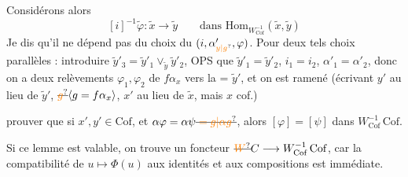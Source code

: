 Considérons alors
\[
 [i]^{-1}\widetilde\varphi\colon\widetilde x\longrightarrow\widetilde y
 \qquad\text{dans }\mathrm{Hom}_{W_{\mathrm{Cof}}^{-1}}(\widetilde x,\widetilde y)
\]
Je dis qu'il ne dépend pas du choix du $(i,\alpha'_{\unsure{y|g}},\varphi)$. Pour deux tels choix 
parallèles : introduire $\widetilde y'_3=\widetilde y'_1\vee_{\widetilde y}\widetilde y'_2$, OPS que $\widetilde y'_1=\widetilde y'_2$, $i_1=i_2$, $\alpha'_1=\alpha'_2$, donc on a deux relèvements $\varphi_1,\varphi_2$ de $f\alpha_x$ vers la $\mathord{=}$ $\widetilde y'$,  et on est ramené (écrivant $y'$ au lieu de $\widetilde y'$, $\deleted{\unsure{g}}\inserted{g=f\alpha_x}$, $x'$ au lieu de $\widetilde x$, mais $x$ cof.)

prouver que si $x',y'\in\mathrm{Cof}$, et $\alpha\varphi=\alpha\psi\deleted{\unsure{{}=g|\alpha g}}$, alors $[\varphi]=[\psi]$ dans $W_{\mathrm{Cof}}^{-1}\,\mathrm{Cof}$.

Si ce lemme est valable, on trouve un foncteur $\deleted{\unsure{W}}C\longrightarrow W_{\mathrm{Cof}}^{-1}\,\mathrm{Cof}$, car la compatibilité de $u\mapsto\Phi(u)$ aux identités et aux compositions est immédiate.

